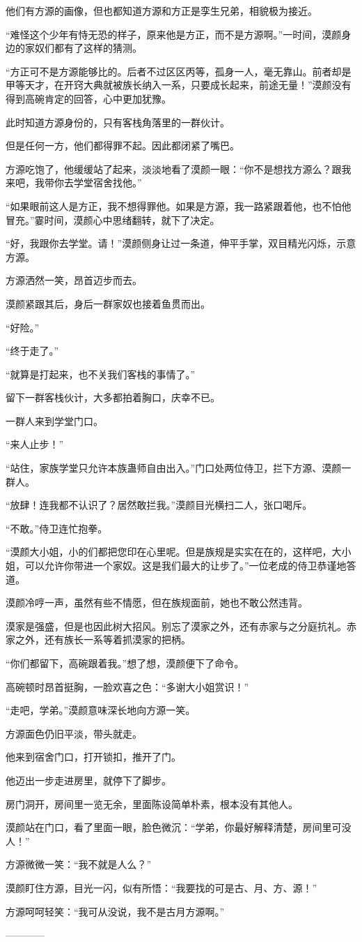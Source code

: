 \begin{this_body}
他们有方源的画像，但也都知道方源和方正是孪生兄弟，相貌极为接近。

“难怪这个少年有恃无恐的样子，原来他是方正，而不是方源啊。”一时间，漠颜身边的家奴们都有了这样的猜测。

“方正可不是方源能够比的。后者不过区区丙等，孤身一人，毫无靠山。前者却是甲等天才，在开窍大典就被族长纳入一系，只要成长起来，前途无量！”漠颜没有得到高碗肯定的回答，心中更加犹豫。

此时知道方源身份的，只有客栈角落里的一群伙计。

但是任何一方，他们都得罪不起。因此都闭紧了嘴巴。

方源吃饱了，他缓缓站了起来，淡淡地看了漠颜一眼：“你不是想找方源么？跟我来吧，我带你去学堂宿舍找他。”

“如果眼前这人是方正，我不想得罪他。如果是方源，我一路紧跟着他，也不怕他冒充。”霎时间，漠颜心中思绪翻转，就下了决定。

“好，我跟你去学堂。请！”漠颜侧身让过一条道，伸平手掌，双目精光闪烁，示意方源。

方源洒然一笑，昂首迈步而去。

漠颜紧跟其后，身后一群家奴也接着鱼贯而出。

“好险。”

“终于走了。”

“就算是打起来，也不关我们客栈的事情了。”

留下一群客栈伙计，大多都拍着胸口，庆幸不已。

一群人来到学堂门口。

“来人止步！”

“站住，家族学堂只允许本族蛊师自由出入。”门口处两位侍卫，拦下方源、漠颜一群人。

“放肆！连我都不认识了？居然敢拦我。”漠颜目光横扫二人，张口喝斥。

“不敢。”侍卫连忙抱拳。

“漠颜大小姐，小的们都把您印在心里呢。但是族规是实实在在的，这样吧，大小姐，可以允许你带进一个家奴。这是我们最大的让步了。”一位老成的侍卫恭谨地答道。

漠颜冷哼一声，虽然有些不情愿，但在族规面前，她也不敢公然违背。

漠家是强盛，但是也因此树大招风。别忘了漠家之外，还有赤家与之分庭抗礼。赤家之外，还有族长一系等着抓漠家的把柄。

“你们都留下，高碗跟着我。”想了想，漠颜便下了命令。

高碗顿时昂首挺胸，一脸欢喜之色：“多谢大小姐赏识！”

“走吧，学弟。”漠颜意味深长地向方源一笑。

方源面色仍旧平淡，带头就走。

他来到宿舍门口，打开锁扣，推开了门。

他迈出一步走进房里，就停下了脚步。

房门洞开，房间里一览无余，里面陈设简单朴素，根本没有其他人。

漠颜站在门口，看了里面一眼，脸色微沉：“学弟，你最好解释清楚，房间里可没人！”

方源微微一笑：“我不就是人么？”

漠颜盯住方源，目光一闪，似有所悟：“我要找的可是古、月、方、源！”

方源呵呵轻笑：“我可从没说，我不是古月方源啊。”

------------

\end{this_body}

